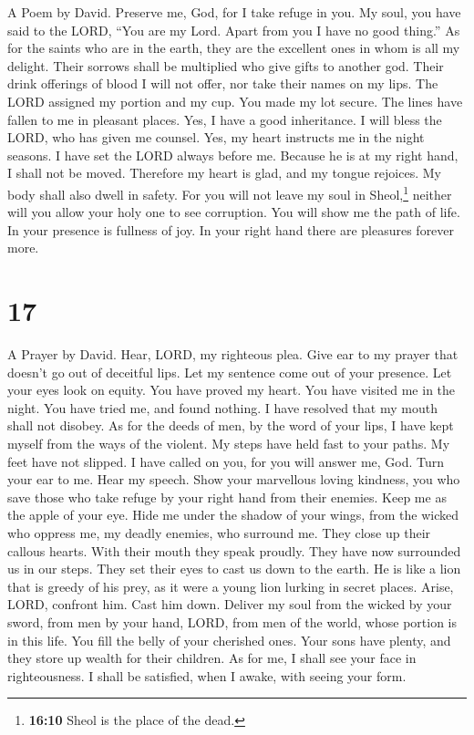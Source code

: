 A Poem by David.  Preserve me, God, for I take refuge in
you.  My soul, you have said to the LORD, ``You are my
Lord. Apart from you I have no good thing.''  As for the
saints who are in the earth, they are the excellent ones in whom is all
my delight.  Their sorrows shall be multiplied who give
gifts to another god. Their drink offerings of blood I will not offer,
nor take their names on my lips.  The LORD assigned my
portion and my cup. You made my lot secure.  The lines
have fallen to me in pleasant places. Yes, I have a good inheritance.
 I will bless the LORD, who has given me counsel. Yes, my
heart instructs me in the night seasons.  I have set the
LORD always before me. Because he is at my right hand, I shall not be
moved.  Therefore my heart is glad, and my tongue
rejoices. My body shall also dwell in safety.  For you
will not leave my soul in Sheol,\footnote{\textbf{16:10} Sheol is the
  place of the dead.} neither will you allow your holy one to see
corruption.  You will show me the path of life. In your
presence is fullness of joy. In your right hand there are pleasures
forever more.

\hypertarget{section-16}{%
\section{17}\label{section-16}}

A Prayer by David.  Hear, LORD, my righteous plea. Give
ear to my prayer that doesn't go out of deceitful lips. 
Let my sentence come out of your presence. Let your eyes look on equity.
 You have proved my heart. You have visited me in the
night. You have tried me, and found nothing. I have resolved that my
mouth shall not disobey.  As for the deeds of men, by the
word of your lips, I have kept myself from the ways of the violent.
 My steps have held fast to your paths. My feet have not
slipped.  I have called on you, for you will answer me,
God. Turn your ear to me. Hear my speech.  Show your
marvellous loving kindness, you who save those who take refuge by your
right hand from their enemies.  Keep me as the apple of
your eye. Hide me under the shadow of your wings,  from
the wicked who oppress me, my deadly enemies, who surround me.
 They close up their callous hearts. With their mouth
they speak proudly.  They have now surrounded us in our
steps. They set their eyes to cast us down to the earth. 
He is like a lion that is greedy of his prey, as it were a young lion
lurking in secret places.  Arise, LORD, confront him.
Cast him down. Deliver my soul from the wicked by your sword,
 from men by your hand, LORD, from men of the world,
whose portion is in this life. You fill the belly of your cherished
ones. Your sons have plenty, and they store up wealth for their
children.  As for me, I shall see your face in
righteousness. I shall be satisfied, when I awake, with seeing your
form.

